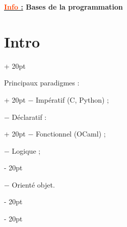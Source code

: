 \documentclass[a4paper, 12pt, twoside]{article}
\renewcommand{\emph}{\textcolor{ff4500}}
\newcommand{\ind}[1][20pt]{\advance\leftskip + #1}
\newcommand{\deind}[1][20pt]{\advance\leftskip - #1}
\newenvironment{indentedenv}[1][20pt]{\par \ind[#1]}{\par \deind}
\newenvironment{indt}[2][20pt]{#2 \begin{indentedenv}[#1]}{\end{indentedenv}} %
\newcommand{\thetitle}[2]{\begin{center}\textbf{{\LARGE \underline{\emph{#1} :}} {\Large #2}}\end{center}}
\begin{document}
    \thetitle{Info}{Bases de la programmation}
    
    \tableofcontents
    \newpage
    
    \begin{indt}{\section{Intro}}
        
        \begin{indt}{Principaux paradigmes :}
            $-$ Impératif (C, Python) ;
            
            \begin{indt}{$-$ Déclaratif :}
                $-$ Fonctionnel (OCaml) ;
                
                $-$ Logique ;
            \end{indt}
            
            \vspace{6pt}
            
            $-$ Orienté objet.
        \end{indt}
        
    \end{indt}
    
    \vspace{12pt}
    
\end{document}

